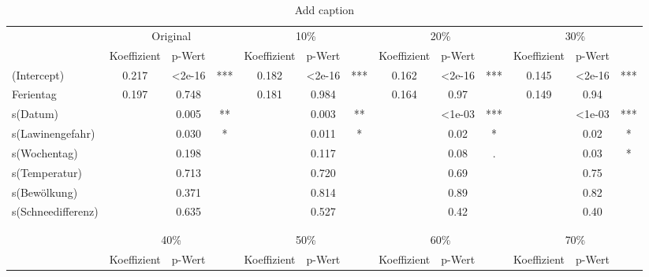 \documentclass[12pt]{scrreprt}
\begin{document}
\begin{table}[htbp]
	\centering
	\caption{Add caption}
	\begin{adjustbox}{max width=\textwidth}
	\begin{tabular}{l|ccc|ccc|ccc|ccc|}
		\multicolumn{1}{r}{} & \multicolumn{3}{c}{Original} & \multicolumn{3}{c}{10\%} & \multicolumn{3}{c}{20\%} & \multicolumn{3}{c}{30\%} \\
		& Koeffizient & p-Wert &       & Koeffizient & p-Wert &       & Koeffizient & p-Wert &       & Koeffizient & p-Wert & \multicolumn{1}{c}{} \\
		\cmidrule{2-13}    (Intercept) & 0.217 & <2e-16 & ***   & 0.182 & <2e-16 & ***   & 0.162 & <2e-16 & ***   & 0.145 & <2e-16 & *** \\
		Ferientag & 0.197 & 0.748 &       & 0.181 & 0.984 &       & 0.164 & 0.97  &       & 0.149 & 0.94  &   \\
		s(Datum) &       & 0.005 & **    &       & 0.003 & **    &       & <1e-03 & ***   &       & <1e-03 & *** \\
		s(Lawinengefahr) &       & 0.030 & *     &       & 0.011 & *     &       & 0.02  & *     &       & 0.02  & * \\
		s(Wochentag) &       & 0.198 &       &       & 0.117 &       &       & 0.08  & .     &       & 0.03  & * \\
		s(Temperatur) &       & 0.713 &       &       & 0.720 &       &       & 0.69  &       &       & 0.75  &   \\
		s(Bewölkung) &       & 0.371 &       &       & 0.814 &       &       & 0.89  &       &       & 0.82  &   \\
		s(Schneedifferenz) &       & 0.635 &       &       & 0.527 &       &       & 0.42  &       &       & 0.40  &   \\
		\cmidrule{2-13}    \multicolumn{1}{r}{} &       &       & \multicolumn{1}{c}{} &       &       & \multicolumn{1}{c}{} &       &       & \multicolumn{1}{c}{} &       &       & \multicolumn{1}{c}{} \\
		\multicolumn{1}{r}{} &       &       & \multicolumn{1}{c}{} &       &       & \multicolumn{1}{c}{} &       &       & \multicolumn{1}{c}{} &       &       & \multicolumn{1}{c}{} \\
		\multicolumn{1}{r}{} & \multicolumn{3}{c}{40\%} & \multicolumn{3}{c}{50\%} & \multicolumn{3}{c}{60\%} & \multicolumn{3}{c}{70\%} \\
		& Koeffizient & p-Wert &       & Koeffizient & p-Wert &       & Koeffizient & p-Wert &       & Koeffizient & p-Wert & \multicolumn{1}{c}{} \\

\end{tabular}
\end{adjustbox}
\end{table}
\end{document}
